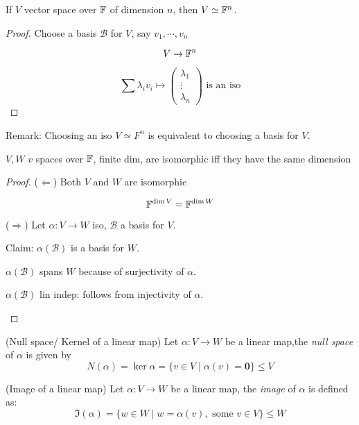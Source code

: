 \documentclass[a4paper]{article}
\begin{document}
\begin{thm} 
	If $ V $ vector space over $ \mathbb{F} $ of dimension $ n $, then $ V \simeq \mathbb{F}^{n} $.
	
\end{thm}

\begin{proof}
	Choose a basis $ \mathcal{B} $ for $ V $, say $ v_{1},\cdots,v_{n} $
	
	\[ V \to \mathbb{F}^{n} \]
	
	\[ \sum \lambda_{i}v_{i} \mapsto \begin{pmatrix}
	\lambda_{1} \\
	\vdots \\
	\lambda_{n}
	\end{pmatrix} \text{ is an iso}\]
\end{proof}

Remark: Choosing an iso $ V \simeq F^{n} $ is equivalent to choosing a basis for $ V $.

\begin{thm} 
	$ V,W $ $ v $ spaces over $ \mathbb{F} $, finite dim, are isomorphic iff they have the same dimension 
\end{thm}

\begin{proof}
	($ \Leftarrow $) Both $ V $ and $ W $ are isomorphic 
	
	\[ \mathbb{F}^{\dim V} = \mathbb{F}^{\dim W} \]
	
	($ \Rightarrow $) Let $ \alpha : V \to W $ iso, $ \mathcal{B} $ a basis for $ V $.
	
	Claim: $ \alpha(\mathcal{B}) $ is a basis for $ W $. 
	
	
	\begin{ex}
		$ \alpha(\mathcal{B}) $ spans $ W $ because of surjectivity of $ \alpha $.
	\end{ex}
	
	\begin{ex}
		$ \alpha(\mathcal{B}) $ lin indep: follows from injectivity of $ \alpha $.
	\end{ex}
\end{proof}

\begin{defi} (Null space/ Kernel of a linear map)
	Let $ \alpha : V \to W $ be a linear map,the \emph{null space} of $ \alpha $ is given by 
	\[ N(\alpha) = \ker \alpha = \{  v \in V \; | \; \alpha(v) = \mathbf{0} \} \leq V \]
\end{defi}	
	
\begin{defi} (Image of a linear map)
			Let $ \alpha : V \to W $ be a linear map, the \emph{image} of $ \alpha $ is defined as:
			  \[ \Im(\alpha) = \{ w \in W \; | \; w = \alpha(v), \text{ some } v \in V  \} \leq W   \]
\end{defi}
\end{document}

